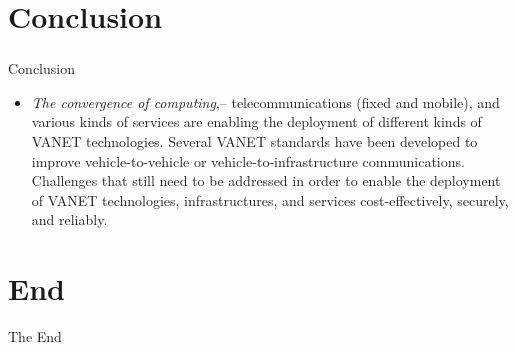 \documentclass{beamer}
\begin{document}
\section{Conclusion}
\begin{frame}
	\frametitle{}
	\begin{block}{Conclusion}
		\begin{itemize}
			\item \textit{The convergence of computing},-- telecommunications (fixed and mobile), and various kinds of services are enabling the deployment of different kinds of VANET technologies. 
			Several VANET standards have been developed to improve vehicle-to-vehicle or vehicle-to-infrastructure communications. 
			Challenges that still need to be addressed in order to enable the deployment of VANET technologies, infrastructures, and services cost-effectively, securely, and reliably.
			
			
			
			
			
			
			
			
		\end{itemize}
	\end{block}
\end{frame}

\section{End}

\begin{frame}
	\Huge{\centerline{The End}}
	
\end{frame}








\end{document}
